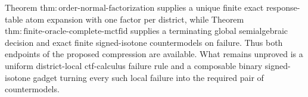 Theorem \(\mathrm{thm:order\text{-}normal\text{-}factorization}\) supplies a unique finite exact response-table atom expansion with one factor per district, while Theorem \(\mathrm{thm:finite\text{-}oracle\text{-}complete\text{-}mctfid}\) supplies a terminating global semialgebraic decision and exact finite signed-isotone countermodels on failure.  Thus both endpoints of the proposed compression are available.  What remains unproved is a uniform district-local ctf-calculus failure rule and a composable binary signed-isotone gadget turning every such local failure into the required pair of countermodels.